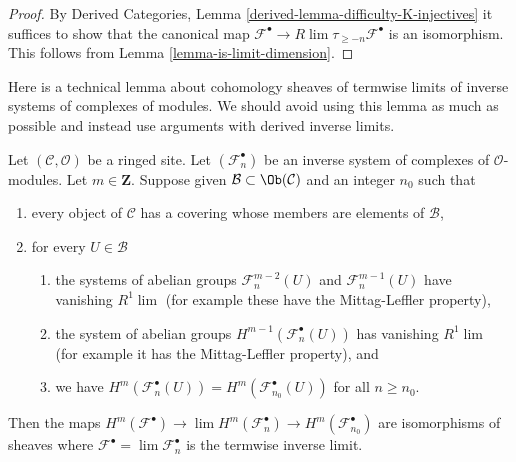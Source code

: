 \begin{proof}
By Derived Categories, Lemma \ref{derived-lemma-difficulty-K-injectives}
it suffices to show that the canonical map
$\mathcal{F}^\bullet \to R\lim \tau_{\geq -n} \mathcal{F}^\bullet$
is an isomorphism. This follows from Lemma \ref{lemma-is-limit-dimension}.
\end{proof}

\noindent
Here is a technical lemma about cohomology sheaves of termwise limits of
inverse systems of complexes of modules. We should avoid using this lemma
as much as possible and instead use arguments with derived inverse
limits.

\begin{lemma}
\label{lemma-inverse-limit-complexes}
Let $(\mathcal{C}, \mathcal{O})$ be a ringed site. Let
$(\mathcal{F}_n^\bullet)$ be an inverse system of complexes of
$\mathcal{O}$-modules. Let $m \in \mathbf{Z}$. Suppose given
$\mathcal{B} \subset \Ob(\mathcal{C})$ and an integer
$n_0$ such that
\begin{enumerate}
\item every object of $\mathcal{C}$ has a covering whose members are
elements of $\mathcal{B}$,
\item for every $U \in \mathcal{B}$
\begin{enumerate}
\item the systems of abelian groups
$\mathcal{F}_n^{m - 2}(U)$ and $\mathcal{F}_n^{m - 1}(U)$
have vanishing $R^1\lim$ (for example these have the Mittag-Leffler property),
\item the system of abelian groups $H^{m - 1}(\mathcal{F}_n^\bullet(U))$
has vanishing $R^1\lim$ (for example it has the Mittag-Leffler property), and
\item we have
$H^m(\mathcal{F}_n^\bullet(U)) = H^m(\mathcal{F}_{n_0}^\bullet(U))$
for all $n \geq n_0$.
\end{enumerate}
\end{enumerate}
Then the maps $H^m(\mathcal{F}^\bullet) \to \lim H^m(\mathcal{F}_n^\bullet)
\to H^m(\mathcal{F}_{n_0}^\bullet)$ are isomorphisms of sheaves where
$\mathcal{F}^\bullet = \lim \mathcal{F}_n^\bullet$ is the termwise
inverse limit. 
\end{lemma}

